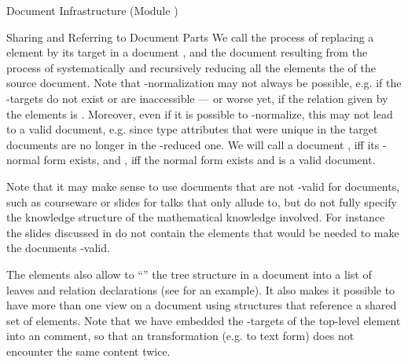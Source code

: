 \begin{tchapter}[id=omdoc-infrastructure,short=Document Infrastructure]{Document Infrastructure (Module {})}
\begin{tsection}[id=sharing,short=Sharing Document Parts]{Sharing and Referring to Document Parts}
  We call the process of replacing a {} element by its target in a document
  {},
  and the document resulting from the process of systematically and recursively reducing
  all the {} elements the {} of the source document. Note that {}-normalization
  may not always be possible, e.g.  if the
  {}-targets
  do not exist or are inaccessible --- or worse yet, if the relation given by the
  {} elements is {}. Moreover, even if it is possible to
  {}-normalize, this may not lead to a valid {\omdoc} document, e.g.  since
  {} type attributes that were unique in the target documents
  are no longer in the {}-reduced one. We will call a document
  {},
  iff its {}-normal form exists, and
  {},
  iff the {} normal form exists and is a valid {\omdoc} document.
  
Note that it may make sense to use documents that are not {}-valid for
{} documents, such as courseware or slides for talks that
only allude to, but do not fully specify the knowledge structure of the mathematical
knowledge involved. For instance the slides discussed in {}
do not contain the {} elements that would be needed to make the documents
{}-valid.

The {} elements also allow to ``{}'' the tree
structure in a document into a list of leaves and relation declarations (see
{} for an example). It also makes it possible to have more than
one view on a document using {} structures that reference a
shared set of {\omdoc} elements. Note that we have embedded the
{}-targets of the top-level {} element into an
{} comment, so that an {\omdoc} transformation (e.g. to text form)
does not encounter the same content twice.


\end{tsection}
\end{tchapter}
